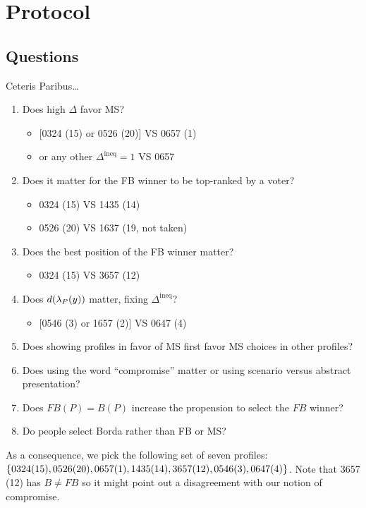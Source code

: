 \documentclass[pagesize, twoside=off, bibliography=totoc, DIV=calc, fontsize=12pt, a4paper]{scrartcl}
\begin{document}
\section{Protocol}
\subsection{Questions}
Ceteris Paribus…
\begin{enumerate}
	\item Does high $\Delta$ favor MS?
	\begin{itemize}
		\item {}[0324 (15) or 0526 (20)] VS 0657 (1)
		\item or any other $\Delta^\text{ineq} = 1$ VS 0657
	\end{itemize}
	\item Does it matter for the FB winner to be top-ranked by a voter? 
	\begin{itemize}
		\item 0324 (15) VS 1435 (14)
		\item 0526 (20) VS 1637 (19, not taken)
	\end{itemize}
	\item Does the best position of the FB winner matter?
	\begin{itemize}
		\item 0324 (15) VS 3657 (12)
	\end{itemize}
	\item Does $d(\lambda_P(y))$ matter, fixing $\Delta^\text{ineq}$?
	\begin{itemize}
		\item{} [0546 (3) or 1657 (2)] VS 0647 (4)
	\end{itemize}
	\item Does showing profiles in favor of MS first favor MS choices in other profiles?
	\item Does using the word “compromise” matter or using scenario  versus abstract presentation?
	\item Does $FB(P) = B(P)$ increase the propension to select the $FB$ winner?
	\item Do people select Borda rather than FB or MS?
\end{enumerate}
As a consequence, we pick the following set of seven profiles: $\{0324 (15), 0526 (20), 0657 (1), \allowbreak 1435 (14), \allowbreak 3657 (12), \allowbreak 0546 (3), 0647 (4)\}$.
Note that 3657 (12) has $B ≠ FB$ so it might point out a disagreement with our notion of compromise.
\end{document}
